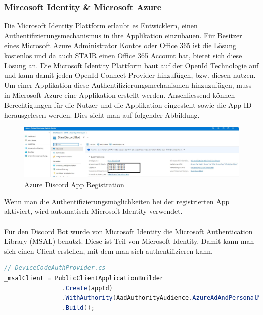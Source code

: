 \documentclass[a4paper, table]{article}
\begin{document}
\subsubsection*{Mircosoft Identity \& Microsoft Azure}
Die Microsoft Identity Plattform erlaubt es Entwicklern, einen Authentifizierungsmechanismus in ihre Applikation einzubauen. 
Für Besitzer eines Microsoft Azure Administrator Kontos oder Office 365 ist die Lösung kostenlos und da auch STAIR einen Office 365 Account hat, bietet sich diese Lösung an. 
Die Microsoft Identity Plattform baut auf der OpenId Technologie auf und kann damit jeden OpenId Connect Provider hinzufügen, \gls{bzw.}  diesen nutzen. 
Um einer Applikation diese Authentifizierungsmechanismen hinzuzufügen, muss in Microsoft Azure eine Applikation erstellt werden. 
Anschliessend können Berechtigungen für die Nutzer und die Applikation eingestellt sowie die App-ID herausgelesen werden. \autocite{noauthor_introduction_nodate}
Dies sieht man auf folgender Abbildung.

\begin{figure}[h]
    \centering
    \includegraphics[width=1\textwidth]{img/azure_discord_app_blacked.png}
    \caption{Azure Discord App Registration}
    \label{fig:azure-discord-app-registration}
\end{figure}
Wenn man die Authentifizierungsmöglichkeiten bei der registrierten App aktiviert, wird automatisch Microsoft Identity verwendet.\\\\
Für den Discord Bot wurde von Microsoft Identity die Microsoft Authentication Library (MSAL) benutzt.\autocite{dickson-mwendia_initialize_nodate}
Diese ist Teil von Microsoft Identity. 
Damit kann man sich einen Client erstellen, mit dem man sich authentifizieren kann.

\begin{lstlisting}[language=csharp]
// DeviceCodeAuthProvider.cs
_msalClient = PublicClientApplicationBuilder
                .Create(appId)
                .WithAuthority(AadAuthorityAudience.AzureAdAndPersonalMicrosoftAccount, true)
                .Build();
\end{lstlisting}
\end{document}
